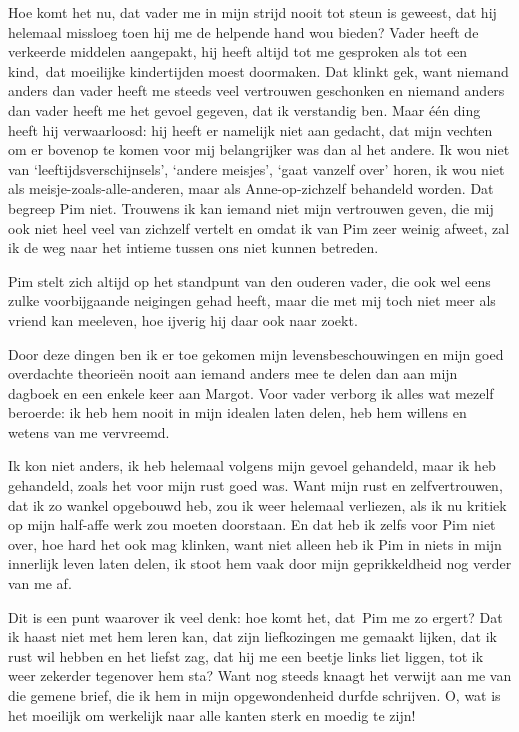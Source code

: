 \documentclass{book}
\begin{document}
Hoe komt het nu, dat vader me in mijn strijd nooit tot steun is geweest,
dat hij helemaal missloeg toen hij me de helpende hand wou bieden? Vader
heeft de verkeerde middelen aangepakt, hij heeft altijd tot me gesproken
als tot een kind,~dat moeilijke kindertijden moest doormaken. Dat klinkt
gek, want niemand anders dan vader heeft me steeds veel vertrouwen
geschonken en niemand anders dan vader heeft me het gevoel gegeven, dat
ik verstandig ben. Maar één ding heeft hij verwaarloosd: hij heeft er
namelijk niet aan gedacht, dat mijn vechten om er bovenop te komen voor
mij belangrijker was dan al het andere. Ik wou niet van
`leeftijdsverschijnsels', `andere meisjes', `gaat vanzelf over' horen,
ik wou niet als meisje-zoals-alle-anderen, maar als Anne-op-zichzelf
behandeld worden. Dat begreep Pim niet. Trouwens ik kan iemand niet mijn
vertrouwen geven, die mij ook niet heel veel van zichzelf vertelt en
omdat ik van Pim zeer weinig afweet, zal ik de weg naar het intieme
tussen ons niet kunnen betreden.

Pim stelt zich altijd op het standpunt van den ouderen vader, die ook
wel eens zulke voorbijgaande neigingen gehad heeft, maar die met mij
toch niet meer als vriend kan meeleven, hoe ijverig hij daar ook naar
zoekt.

Door deze dingen ben ik er toe gekomen mijn levensbeschouwingen en mijn
goed overdachte theorieën nooit aan iemand anders mee te delen dan aan
mijn dagboek en een enkele keer aan Margot. Voor vader verborg ik alles
wat mezelf beroerde: ik heb hem nooit in mijn idealen laten delen, heb
hem willens en wetens van me vervreemd.

Ik kon niet anders, ik heb helemaal volgens mijn gevoel gehandeld, maar
ik heb gehandeld, zoals het voor mijn rust goed was. Want mijn rust en
zelfvertrouwen, dat ik zo wankel opgebouwd heb, zou ik weer helemaal
verliezen, als ik nu kritiek op mijn half-affe werk zou moeten
doorstaan. En dat heb ik zelfs voor Pim niet over, hoe hard het ook mag
klinken, want niet alleen heb ik Pim in niets in mijn innerlijk leven
laten delen, ik stoot hem vaak door mijn geprikkeldheid nog verder van
me af.

Dit is een punt waarover ik veel denk: hoe komt het, dat~Pim me zo
ergert? Dat ik haast niet met hem leren kan, dat zijn liefkozingen me
gemaakt lijken, dat ik rust wil hebben en het liefst zag, dat hij me een
beetje links liet liggen, tot ik weer zekerder tegenover hem sta? Want
nog steeds knaagt het verwijt aan me van die gemene brief, die ik hem in
mijn opgewondenheid durfde schrijven. O, wat is het moeilijk om
werkelijk naar alle kanten sterk en moedig te zijn!
\end{document}
